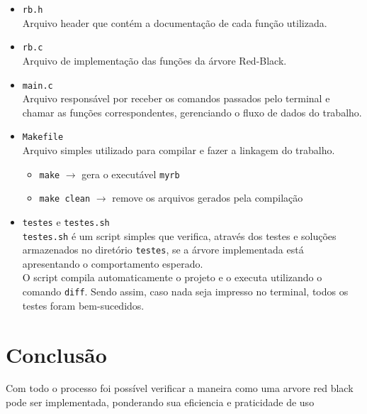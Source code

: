 \documentclass{article}
\begin{document}
    \begin{itemize}
        \item \texttt{rb.h} \\
        Arquivo header que contém a documentação de cada função utilizada.
        
        \item \texttt{rb.c} \\
        Arquivo de implementação das funções da árvore Red-Black.
        
        \item \texttt{main.c} \\
        Arquivo responsável por receber os comandos passados pelo terminal e chamar as funções correspondentes, gerenciando o fluxo de dados do trabalho.
        
        \item \texttt{Makefile} \\
        Arquivo simples utilizado para compilar e fazer a linkagem do trabalho.
        \begin{itemize}
            \item \texttt{make} \( \rightarrow \) gera o executável \texttt{myrb}
            \item \texttt{make clean} \( \rightarrow \) remove os arquivos gerados pela compilação
        \end{itemize}
        
        \item \texttt{testes} e \texttt{testes.sh} \\
        \texttt{testes.sh} é um script simples que verifica, através dos testes e soluções armazenados no diretório \texttt{testes}, se a árvore implementada está apresentando o comportamento esperado.\\
        O script compila automaticamente o projeto e o executa utilizando o comando \texttt{diff}. Sendo assim, caso nada seja impresso no terminal, todos os testes foram bem-sucedidos.
    \end{itemize}

        
    \section{Conclusão}

    Com todo o processo foi possível verificar a maneira como uma arvore red black pode ser implementada, ponderando sua eficiencia e praticidade de uso 
\end{document}
